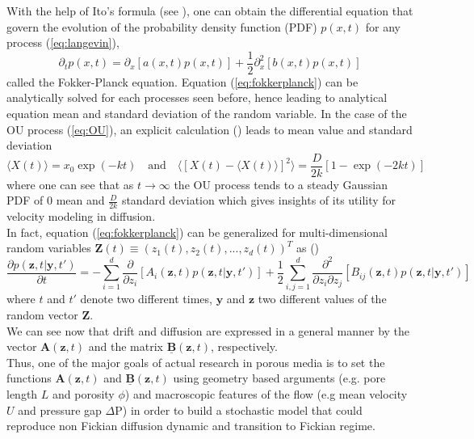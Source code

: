 With the help of Ito's formula (see \citet[Sec. 4.3.4]{Gardiner1996}), one can obtain the differential equation that govern the evolution of the probability density function (PDF) $p(x,t)$ for any process (\ref{eq:langevin}),
\begin{equation}
\partial_t p(x,t) = \partial_x[a(x,t)p(x,t)] + \frac{1}{2}\partial^2_x [b(x,t)p(x,t)]
\label{eq:fokkerplanck} 
\end{equation}
called the Fokker-Planck equation. Equation (\ref{eq:fokkerplanck}) can be analytically solved for each processes seen before, hence leading to analytical equation mean and standard deviation of the random variable. In the case of the OU process (\ref{eq:OU}), an explicit calculation (\cite[Sec. 3.8.4]{Gardiner1996}) leads to mean value and standard deviation
\[
\langle X(t)\rangle=x_0 \exp(-kt) \quad\textrm{and}\quad \langle[X(t)-\langle X(t)\rangle]^2\rangle=\frac{D}{2k}[1-\exp(-2kt)]
\]
where one can see that as $t\rightarrow\infty$ the OU process tends to a steady Gaussian PDF of $0$ mean and $\frac{D}{2k}$ standard deviation which gives insights of its utility for velocity modeling in diffusion. \\
In fact, equation (\ref{eq:fokkerplanck}) can be generalized for multi-dimensional random variables $\textbf{Z}(t)\equiv(z_1(t),z_2(t),...,z_d(t))^T$ as (\citet[Sec. 3.5.2]{Gardiner1996}) 
\begin{equation}
\frac{\partial p(\textbf{z},t|\textbf{y},t')}{\partial t} =
-\sum_{i=1}^d\frac{\partial}{\partial z_i}[A_i(\textbf{z},t)p(\textbf{z},t|\textbf{y},t')]
+ \frac{1}{2}\sum_{i,j=1}^d\frac{\partial^2 }{\partial z_i \partial z_j}[B_{ij}(\textbf{z},t)p(\textbf{z},t|\textbf{y},t')]
\label{eq:mdfp}
\end{equation}
where $t$ and $t'$ denote two different times, $\textbf{y}$ and $\textbf{z}$ two different values of the random vector $\textbf{Z}$.\\ 
We can see now that drift and diffusion are expressed in a general manner by the vector $\textbf{A}(\textbf{z},t)$ and the matrix $\underline{\textbf{B}}(\textbf{z},t)$, respectively.\\
Thus, one of the major goals of actual research in porous media is to set the functions $\textbf{A}(\textbf{z},t)$ and $\underline{\textbf{B}}(\textbf{z},t)$ using geometry based arguments (e.g. pore length $L$ and porosity $\phi$) and macroscopic features of the flow (e.g mean velocity $U$ and pressure gap $\Delta\textrm{P}$) in order to build a stochastic model that could reproduce non Fickian diffusion dynamic and transition to Fickian regime.\\

